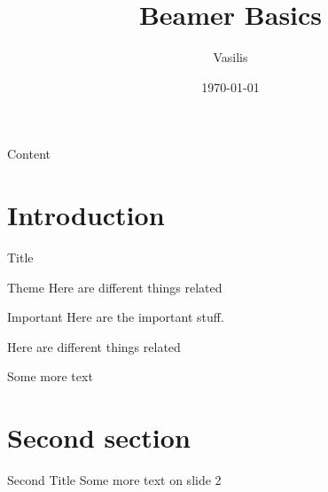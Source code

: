 \documentclass{beamer}
\title{Beamer Basics}
\author{Vasilis}
\date{\today}
\institute{A University}
\begin{document}
\maketitle

\begin{frame}{Content}
\tableofcontents
\end{frame}

\section{Introduction}

\begin{frame}{Title}
\begin{block}{Theme}
Here are different things \alert{related}
\end{block}\pause
\begin{alertblock}{Important}
Here are the important stuff.
\end{alertblock}\pause
\begin{example}
Here are different things related
\end{example}
Some more text
\end{frame}

\section{Second section}
\begin{frame}{Second Title}
Some more text on slide 2
\end{frame}
\end{document}

